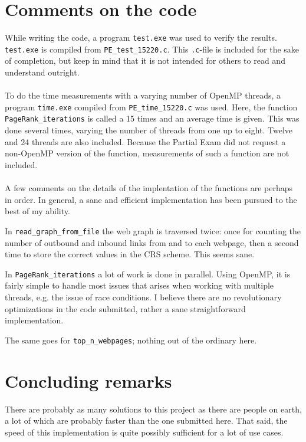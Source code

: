 \documentclass{in1150-innlevering}
\begin{document}
\section*{Comments on the code}
\label{sec:misc}
	While writing the code, a program \texttt{test.exe} was used to verify the results. \texttt{test.exe} is compiled from \texttt{PE\_test\_15220.c}. This \texttt{.c}-file is included for the sake of completion, but keep in mind that it is not intended for others to read and understand outright.\\
	\\
	To do the time measurements with a varying number of OpenMP threads, a program \texttt{time.exe} compiled from \texttt{PE\_time\_15220.c} was used. Here, the function \texttt{PageRank\_iterations} is called a 15 times and an average time is given. This was done several times, varying the number of threads from one up to eight. Twelve and 24 threads are also included. Because the Partial Exam did not request a non-OpenMP version of the function, measurements of such a function are not included.\\
	\\
	A few comments on the details of the implentation of the functions are perhaps in order. In general, a sane and efficient implementation has been pursued to the best of my ability.

	In \texttt{read\_graph\_from\_file} the web graph is traversed twice: once for counting the number of outbound and inbound links from and to each webpage, then a second time to store the correct values in the CRS scheme. This seems sane.

	In \texttt{PageRank\_iterations} a lot of work is done in parallel. Using OpenMP, it is fairly simple to handle most issues that arises when working with multiple threads, e.g. the issue of race conditions. I believe there are no revolutionary optimizations in the code submitted, rather a sane straightforward implementation.

	The same goes for \texttt{top\_n\_webpages}; nothing out of the ordinary here.
	
\section*{Concluding remarks}
\label{sec:concluding_remarks}
	There are probably as many solutions to this project as there are people on earth, a lot of which are probably faster than the one submitted here. That said, the speed of this implementation is quite possibly sufficient for a lot of use cases.
\end{document}
